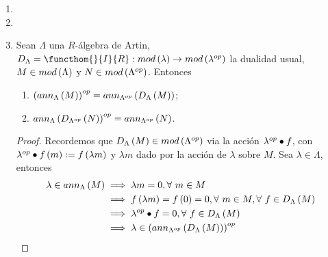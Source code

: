 \documentclass{article}
\begin{document}
\begin{enumerate}[label=\textbf{Ej \arabic*.}]
\begin{proof}
			 Notemos primeramente que, si $r\in I$ y $m\in M$, entonces $rm=\lrprth{r+I}m=\lrprth{I}m=0$, pues $I$ es el neutro aditivo de $\faktor{R}{I}$. Así \begin{equation*}\tag{*}\label{IcontAnn}
				I\subseteq ann_R\lrprth{M}.
			\end{equation*}
			Ahora
			\begin{align*}
				\ringmod{\faktor{R}{I}}{M}{l}\text{ es fiel }&\iff ann_{\faktor{R}{I}}\lrprth{M}=\gengroup{I}\\
				&\iff \pi\lrprth{ann_R\lrprth{M}}=\gengroup{I}, && a)\\
				&\iff ann_R\lrprth{M}\subseteq Ker\lrprth{\pi}=I\\
				&\iff ann_R\lrprth{M}=I. && \lrprth{\text{\ref{IcontAnn}}}
			\end{align*}
		\end{proof}
		\item
		\item
		\item Sean $\Lambda$ una $R$-álgebra de Artin, $D_{\Lambda}=\functhom{}{I}{R}:mod\lrprth{\lambda}\to mod\lrprth{\opst{\lambda}}$ la dualidad usual, $M\in mod\left(\Lambda\right)$ y $N\in mod\left({\Lambda}^{op}\right)$. Entonces
		\begin{enumerate}
			\item  ${\left(ann_{\Lambda}\left(M\right)\right)}^{op}=ann_{{\Lambda}^{op}}\left(D_{\Lambda}\left(M\right)\right)$;
			\item ${ann_{\Lambda}\left(D_{{\Lambda}^{op}}\left(N\right)\right)}^{op}=ann_{{\Lambda}^{op}}\left(N\right)$.
		\end{enumerate}
		\begin{proof}
			Recordemos que $D_{\Lambda}\left(M\right)\in mod\left({\Lambda}^{op}\right)$ via la acción ${\lambda}^{op}\bullet f$, con ${\lambda}^{op}\bullet f\left(m\right):=f\left(\lambda m\right)$ y $\lambda m$ dado por la acción de $\lambda$ sobre $M$. Sea $\lambda\in\Lambda$, entonces
			\begin{align*}
				\lambda\in ann_{\Lambda}\lrprth{M}&\implies \lambda m=0, \forall\ m\in M\\
				&\implies f\lrprth{\lambda m}=f\lrprth{0}=0,\forall\ m\in M, \forall\ f\in D_{\Lambda}\lrprth{M}\\\
				&\implies \opst{\lambda}\bullet f=0, \forall\ f\in D_{\Lambda}\lrprth{M}\\
				&\implies \lambda\in \opst{\lrprth{ann_{\opst{\Lambda}}\lrprth{D_{\Lambda}\lrprth{M}}}}\\

\end{align*}
\end{proof}
\end{enumerate}
\end{document}
